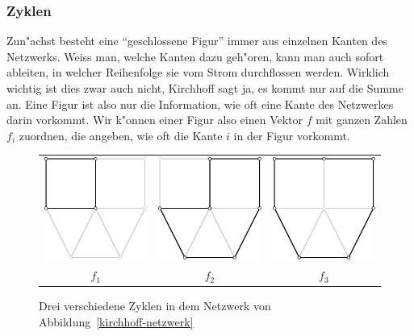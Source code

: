 \subsubsection{Zyklen}
Zun"achst besteht eine ``geschlossene Figur'' immer aus einzelnen
Kanten des Netzwerks. Weiss man, welche Kanten dazu geh"oren, kann
man auch sofort ableiten, in welcher Reihenfolge sie vom Strom
durchflossen werden. Wirklich wichtig ist dies zwar auch nicht,
Kirchhoff sagt ja, es kommt nur auf die Summe an. Eine 
Figur ist also nur die Information, wie oft eine Kante des Netzwerkes darin
vorkommt. Wir k"onnen einer Figur also einen Vektor $f$ mit ganzen
Zahlen $f_i$ zuordnen, die angeben, wie oft die Kante $i$ in der
Figur vorkommt.
\begin{figure}
\begin{center}
\begin{tabular}{ccc}
\includegraphics[width=0.25\hsize]{images/kirchhoff-3}&
\includegraphics[width=0.25\hsize]{images/kirchhoff-4}&
\includegraphics[width=0.25\hsize]{images/kirchhoff-5}
\\
$f_1$&$f_2$&$f_3$
\end{tabular}
\end{center}
\caption{Drei verschiedene Zyklen in dem Netzwerk von Abbildung~\ref{kirchhoff-netzwerk}
\label{kirchhoff-zyklen}}
\end{figure}

